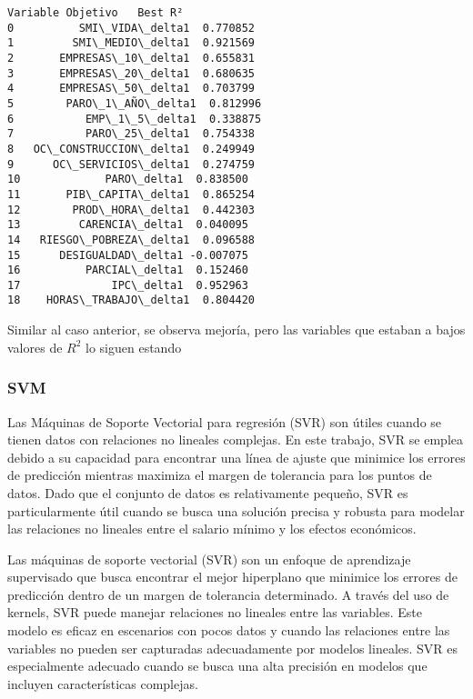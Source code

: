 \documentclass[11pt]{article}
\begin{document}
    
    \begin{Verbatim}[commandchars=\\\{\}]
         Variable Objetivo   Best R²
0          SMI\_VIDA\_delta1  0.770852
1         SMI\_MEDIO\_delta1  0.921569
2       EMPRESAS\_10\_delta1  0.655831
3       EMPRESAS\_20\_delta1  0.680635
4       EMPRESAS\_50\_delta1  0.703799
5        PARO\_1\_AÑO\_delta1  0.812996
6           EMP\_1\_5\_delta1  0.338875
7           PARO\_25\_delta1  0.754338
8   OC\_CONSTRUCCION\_delta1  0.249949
9      OC\_SERVICIOS\_delta1  0.274759
10             PARO\_delta1  0.838500
11       PIB\_CAPITA\_delta1  0.865254
12        PROD\_HORA\_delta1  0.442303
13         CARENCIA\_delta1  0.040095
14   RIESGO\_POBREZA\_delta1  0.096588
15      DESIGUALDAD\_delta1 -0.007075
16          PARCIAL\_delta1  0.152460
17              IPC\_delta1  0.952963
18    HORAS\_TRABAJO\_delta1  0.804420
    \end{Verbatim}

    
    Similar al caso anterior, se observa mejoría, pero las variables que
estaban a bajos valores de \(R^2\) lo siguen estando

    \subsubsection{SVM}\label{svm}

    Las Máquinas de Soporte Vectorial para regresión (SVR) son útiles cuando
se tienen datos con relaciones no lineales complejas. En este trabajo,
SVR se emplea debido a su capacidad para encontrar una línea de ajuste
que minimice los errores de predicción mientras maximiza el margen de
tolerancia para los puntos de datos. Dado que el conjunto de datos es
relativamente pequeño, SVR es particularmente útil cuando se busca una
solución precisa y robusta para modelar las relaciones no lineales entre
el salario mínimo y los efectos económicos.

Las máquinas de soporte vectorial (SVR) son un enfoque de aprendizaje
supervisado que busca encontrar el mejor hiperplano que minimice los
errores de predicción dentro de un margen de tolerancia determinado. A
través del uso de kernels, SVR puede manejar relaciones no lineales
entre las variables. Este modelo es eficaz en escenarios con pocos datos
y cuando las relaciones entre las variables no pueden ser capturadas
adecuadamente por modelos lineales. SVR es especialmente adecuado cuando
se busca una alta precisión en modelos que incluyen características
complejas.
\end{document}
